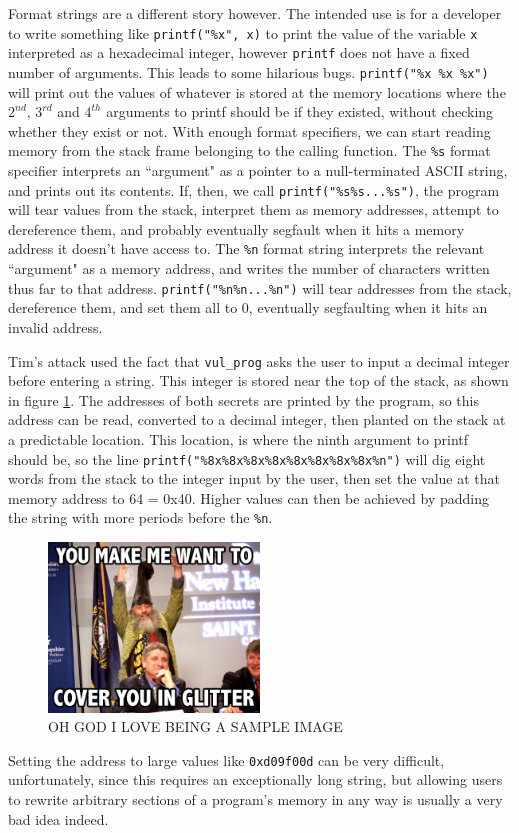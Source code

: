 Format strings are a different story however. The intended use is for a developer to write something like {\tt printf("\%x", x)} to print the value of the variable {\tt x} interpreted as a hexadecimal integer, however {\tt printf} does not have a fixed number of arguments. This leads to some hilarious bugs. {\tt printf("\%x \%x \%x")} will print out the values of whatever is stored at the memory locations where the $2^{nd}$, $3^{rd}$ and $4^{th}$ arguments to printf should be if they existed, without checking whether they exist or not. With enough format specifiers, we can start reading memory from the stack frame belonging to the calling function. The {\tt \%s} format specifier interprets an ``argument" as a pointer to a null-terminated ASCII string, and prints out its contents. If, then, we call {\tt printf("\%s\%s...\%s")}, the program will tear values from the stack, interpret them as memory addresses, attempt to dereference them, and probably eventually segfault when it hits a memory address it doesn't have access to. The {\tt \%n} format string interprets the relevant ``argument" as a memory address, and writes the number of characters written thus far to that address. {\tt printf("\%n\%n...\%n")} will tear addresses from the stack, dereference them, and set them all to 0, eventually segfaulting when it hits an invalid address.

Tim's attack used the fact that {\tt vul\_prog} asks the user to input a decimal integer before entering a string. This integer is stored near the top of the stack, as shown in figure \ref{fig_vul_prog_stack}. The addresses of both secrets are printed by the program, so this address can be read, converted to a decimal integer, then planted on the stack at a predictable location. This location, is where the ninth argument to printf should be, so the line {\tt printf("\%8x\%8x\%8x\%8x\%8x\%8x\%8x\%8x\%n")} will dig eight words from the stack to the integer input by the user, then set the value at that memory address to 64 = 0x40. Higher values can then be achieved by padding the string with more periods before the {\tt \%n}.


\begin{figure}[h]
\centering
\includegraphics[width = 0.5\textwidth]{./images/placeholder.jpg}
\caption{OH GOD I LOVE BEING A SAMPLE IMAGE}
\label{fig_vul_prog_stack}
\end{figure}



Setting the address to large values like {\tt 0xd09f00d} can be very difficult, unfortunately, since this requires an exceptionally long string, but allowing users to rewrite arbitrary sections of a program's memory in any way is usually a very bad idea indeed.
